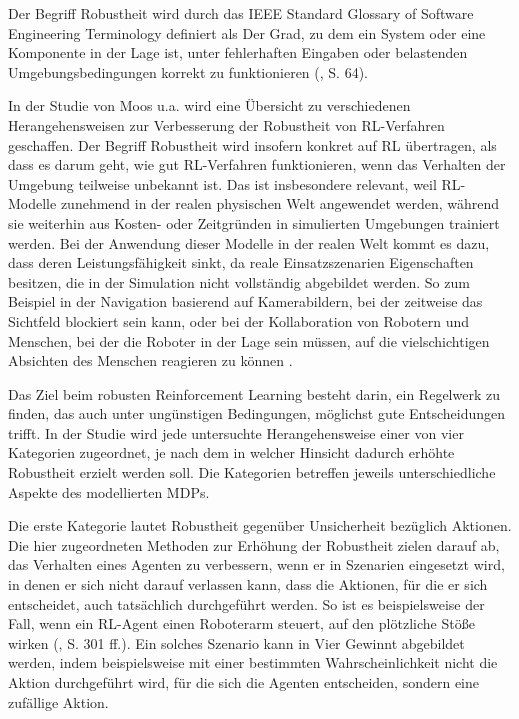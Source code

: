 \label{robustheit}

Der Begriff Robustheit wird durch das IEEE Standard Glossary of Software Engineering Terminology definiert als \glqq Der Grad, zu dem ein System oder eine Komponente in der Lage ist, unter fehlerhaften Eingaben oder belastenden Umgebungsbedingungen korrekt zu funktionieren\grqq{} (\cite{IEEE.1990}, S. 64).

In der Studie von Moos u.a. wird eine Übersicht zu verschiedenen Herangehensweisen zur Verbesserung der Robustheit von RL-Verfahren geschaffen. Der Begriff Robustheit wird insofern konkret auf RL übertragen, als dass es darum geht, wie gut RL-Verfahren funktionieren, wenn das Verhalten der Umgebung teilweise unbekannt ist. Das ist insbesondere relevant, weil RL-Modelle zunehmend in der realen physischen Welt angewendet werden, während sie weiterhin aus Kosten- oder Zeitgründen in simulierten Umgebungen trainiert werden. Bei der Anwendung dieser Modelle in der realen Welt kommt es dazu, dass deren Leistungsfähigkeit sinkt, da reale Einsatzszenarien Eigenschaften besitzen, die in der Simulation nicht vollständig abgebildet werden. So zum Beispiel in der Navigation basierend auf Kamerabildern, bei der zeitweise das Sichtfeld blockiert sein kann, oder bei der Kollaboration von Robotern und Menschen, bei der die Roboter in der Lage sein müssen, auf die vielschichtigen Absichten des Menschen reagieren zu können \cite{Moos.2022}\cite{Ni.2021}.

Das Ziel beim robusten Reinforcement Learning besteht darin, ein Regelwerk zu finden, das auch unter ungünstigen Bedingungen, möglichst gute Entscheidungen trifft. In der Studie wird jede untersuchte Herangehensweise einer von vier Kategorien zugeordnet, je nach dem in welcher Hinsicht dadurch erhöhte Robustheit erzielt werden soll. Die Kategorien betreffen jeweils unterschiedliche Aspekte des modellierten MDPs.

Die erste Kategorie lautet Robustheit gegenüber Unsicherheit bezüglich Aktionen. Die hier zugeordneten Methoden zur Erhöhung der Robustheit zielen darauf ab, das Verhalten eines Agenten zu verbessern, wenn er in Szenarien eingesetzt wird, in denen er sich nicht darauf verlassen kann, dass die Aktionen, für die er sich entscheidet, auch tatsächlich durchgeführt werden. So ist es beispielsweise der Fall, wenn ein RL-Agent einen Roboterarm steuert, auf den plötzliche Stöße wirken (\cite{Moos.2022}, S. 301 ff.). Ein solches Szenario kann in Vier Gewinnt abgebildet werden, indem beispielsweise mit einer bestimmten Wahrscheinlichkeit nicht die Aktion durchgeführt wird, für die sich die Agenten entscheiden, sondern eine zufällige Aktion.

